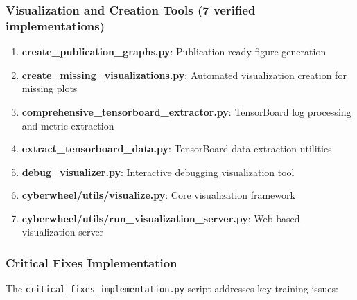 \documentclass[12pt,a4paper]{article}
\begin{document}
\subsubsection{Visualization and Creation Tools (7 verified implementations)}
\begin{enumerate}
    \item \textbf{create\_publication\_graphs.py}: Publication-ready figure generation
    \item \textbf{create\_missing\_visualizations.py}: Automated visualization creation for missing plots
    \item \textbf{comprehensive\_tensorboard\_extractor.py}: TensorBoard log processing and metric extraction
    \item \textbf{extract\_tensorboard\_data.py}: TensorBoard data extraction utilities
    \item \textbf{debug\_visualizer.py}: Interactive debugging visualization tool
    \item \textbf{cyberwheel/utils/visualize.py}: Core visualization framework
    \item \textbf{cyberwheel/utils/run\_visualization\_server.py}: Web-based visualization server
\end{enumerate}

\subsubsection{Critical Fixes Implementation}
The \texttt{critical\_fixes\_implementation.py} script addresses key training issues:
\end{document}
